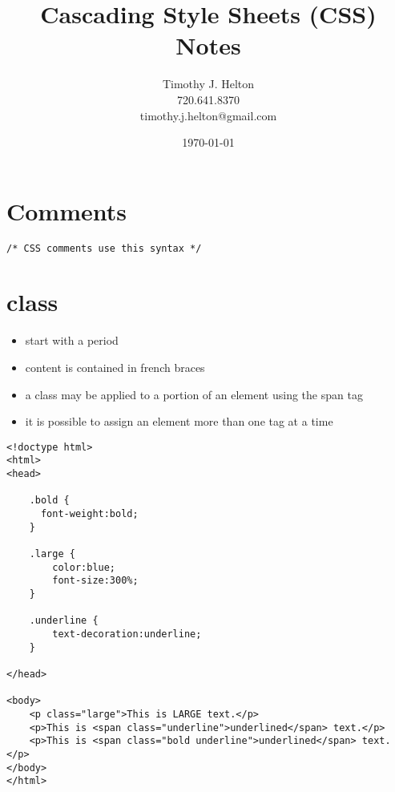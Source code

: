 \documentclass{article}
\newcommand{\mytitle}{Cascading Style Sheets (CSS) Notes}
\begin{document}
\author{Timothy J. Helton\\720.641.8370\\timothy.j.helton@gmail.com}
\date{\today}
\title{\mytitle}

\maketitle
\newpage

\tableofcontents
\newpage

\listoffigures
\listoftables
\newpage


\section{Comments}

\begin{lstlisting}
/* CSS comments use this syntax */
\end{lstlisting}

\section{class}
\begin{itemize}
  \item start with a period
  \item content is contained in french braces
  \item a class may be applied to a portion of an element using the span tag
  \item it is possible to assign an element more than one tag at a time
\end{itemize}
\begin{lstlisting}
<!doctype html>
<html>
<head>

    .bold {
      font-weight:bold;
    }

    .large {
        color:blue;
        font-size:300%;
    }

    .underline {
        text-decoration:underline;
    }

</head>

<body>
    <p class="large">This is LARGE text.</p>
    <p>This is <span class="underline">underlined</span> text.</p>
    <p>This is <span class="bold underline">underlined</span> text.</p>
</body>
</html>
\end{lstlisting}

\end{document}

